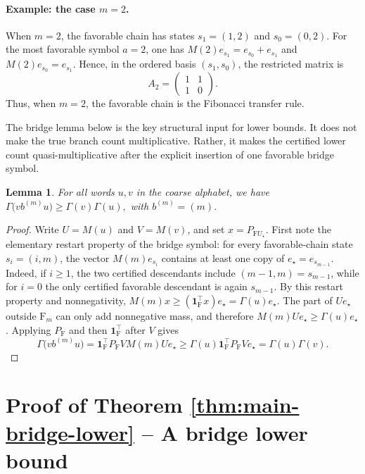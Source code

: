 \documentclass[11pt]{amsart}
\numberwithin{equation}{section}
\theoremstyle{plain}
\newtheorem{lemma}[theorem]{Lemma}
\theoremstyle{definition}
\theoremstyle{remark}
\begin{document}
\paragraph{Example: the case \(m=2\).}
When \(m=2\), the favorable chain has states \(s_1=(1,2)\) and \(s_0=(0,2)\). For the most favorable symbol \(a=2\), one has \(M(2)e_{s_1}=e_{s_0}+e_{s_1}\) and \(M(2)e_{s_0}=e_{s_1}\). Hence, in the ordered basis \((s_1,s_0)\), the restricted matrix is
\[
A_2=
\begin{pmatrix}
1&1\\
1&0
\end{pmatrix}.
\]
Thus, when \(m=2\), the favorable chain is the Fibonacci transfer rule.



The bridge lemma below is the key structural input for lower bounds. It does
not make the true branch count multiplicative. Rather, it makes the certified
lower count quasi-multiplicative after the explicit insertion of one favorable
bridge symbol.

\begin{lemma}\label{thm:bridge-lemma}
For all words \(u,v\) in the coarse alphabet, we have
\(
\Gamma\bigl(v b^{(m)}u\bigr)\ge \Gamma(v)\Gamma(u),
	\)
with	\(
 b^{(m)}=(m).
\)
\end{lemma}

\begin{proof}
Write \(U=M(u)\) and \(V=M(v)\), and set \(x=P_{\mathrm{F}U_\star}\).
First note the elementary restart property of the bridge symbol: for every
favorable-chain state \(s_i=(i,m)\), the vector \(M(m)e_{s_i}\) contains at
least one copy of \(e_\star=e_{s_{m-1}}\). Indeed, if \(i\ge1\), the two
certified descendants include \((m-1,m)=s_{m-1}\), while for \(i=0\) the only
certified favorable descendant is again \(s_{m-1}\).
By this restart property and nonnegativity,
\(M(m)x\ge(\mathbf 1_{\mathrm F}^{\top}x)e_\star=\Gamma(u)e_\star\). The part
of \(Ue_\star\) outside \(\mathrm F_m\) can only add nonnegative mass, and
therefore \(M(m)Ue_\star\ge \Gamma(u)e_\star\). Applying \(P_{\mathrm F}\) and
then \(\mathbf 1_{\mathrm F}^{\top}\) after \(V\) gives
\[
\Gamma\bigl(v b^{(m)}u\bigr)
 =\mathbf 1_{\mathrm F}^{\top}P_{\mathrm F} V M(m)Ue_\star
 \ge \Gamma(u)\mathbf 1_{\mathrm F}^{\top}P_{\mathrm F}Ve_\star
 =\Gamma(u)\Gamma(v).
\]
\end{proof}


\section{Proof of Theorem \ref{thm:main-bridge-lower} -- A bridge lower bound}\label{sec:bridged-lower}
\end{document}
